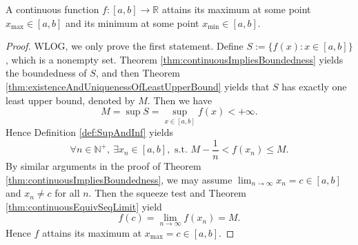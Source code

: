 \begin{thm}
  \label{thm:extremeValues}
  A continuous function $f:[a,b]\rightarrow\mathbb{R}$
  attains its maximum at some point \mbox{$x_{\max}\in [a,b]$}
  and its minimum at some point $x_{\min}\in [a,b]$.
\end{thm}
\begin{proof}
  WLOG, we only prove the first statement.
  Define $S:=\{f(x):x\in [a,b]\}$, which is a nonempty set.
  Theorem
  \ref{thm:continuousImpliesBoundedness} yields the boundedness of $S$,
  and then Theorem
  \ref{thm:existenceAndUniquenessOfLeastUpperBound} yields that $S$ has
  exactly one least upper bound, denoted by $M$. Then we have
  \begin{displaymath}
    M=\sup S=\sup_{x\in[a,b]}f(x)<+\infty.
  \end{displaymath}
  Hence Definition \ref{def:SupAndInf} yields
  \begin{displaymath}
    \forall n\in \mathbb{N}^{+},\ \exists x_{n}\in [a,b],
    \text{ s.t. } M-\frac{1}{n}< f(x_{n}) \le M.
  \end{displaymath}
  By similar arguments in the proof of Theorem
  \ref{thm:continuousImpliesBoundedness},
  we may assume 
  $\lim_{n\rightarrow\infty}x_{n}=c\in[a,b]$ and
  $x_{n}\neq c$ for all $n$.
  Then the squeeze test and
  Theorem \ref{thm:continuousEquivSeqLimit} yield
  \begin{displaymath}
    f(c)=\lim_{n\rightarrow\infty}f(x_{n})=M.
  \end{displaymath}
  Hence $f$ attains its maximum at $x_{\max}=c\in[a,b]$.
\end{proof}

